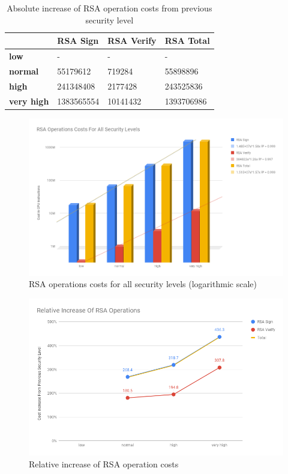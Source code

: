 \documentclass{llncs}
\begin{document}
\begin{table}[]
  \begin{tabular}{|l|l|l|l|}
  \hline
                     & \textbf{RSA Sign} & \textbf{RSA Verify} & \textbf{RSA Total} \\ \hline
  \textbf{low}       & -                 & -                   & -                  \\ \hline
  \textbf{normal}    & 55179612          & 719284              & 55898896           \\ \hline
  \textbf{high}      & 241348408         & 2177428             & 243525836          \\ \hline
  \textbf{very high} & 1383565554        & 10141432            & 1393706986         \\ \hline
  \end{tabular}
  \caption{\label{table:rsa-absolute-cost-increase} Absolute increase of RSA operation costs from previous security level}
  \end{table}

\begin{figure}
  \centering
  \includegraphics[width=1.0\textwidth]{img/rsa_cost_all_sls.png}
  \caption{\label{fig:rsa-costs-all-sls} RSA operations costs for all security levels (logarithmic scale)}
\end{figure}

\begin{figure}
  \centering
  \includegraphics[width=1.0\textwidth]{img/rsa_relative_increase.png}
  \caption{\label{fig:rsa-pub-priv-cost-increase} Relative increase of RSA operation costs}
\end{figure}
\end{document}
